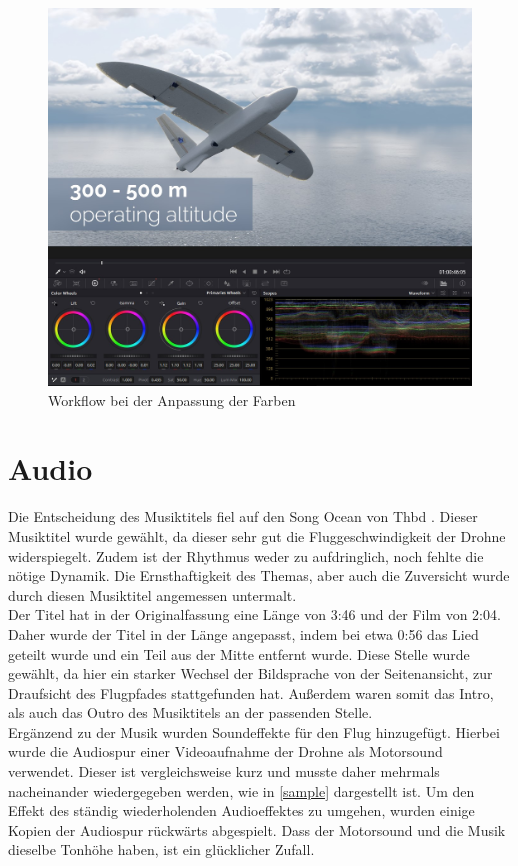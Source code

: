 \begin{figure}[H]
\begin{center}
\includegraphics[width=\textwidth]{gfx/post/resolve7.jpg}
\caption{Workflow bei der Anpassung der Farben}
\label{resolve7}
\end{center}
\end{figure}

\section{Audio}

Die Entscheidung des Musiktitels fiel auf den Song Ocean von Thbd . Dieser Musiktitel wurde gewählt, da dieser sehr gut die Fluggeschwindigkeit der Drohne widerspiegelt. Zudem ist der Rhythmus weder zu aufdringlich, noch fehlte die nötige Dynamik. Die Ernsthaftigkeit des Themas, aber auch die Zuversicht wurde durch diesen Musiktitel angemessen untermalt.\\
Der Titel hat in der Originalfassung eine Länge von 3:46 und der Film von 2:04. Daher wurde der Titel in der Länge angepasst, indem bei etwa 0:56 das Lied geteilt wurde und ein Teil aus der Mitte entfernt wurde. Diese Stelle wurde gewählt, da hier ein starker Wechsel der Bildsprache von der Seitenansicht, zur Draufsicht des Flugpfades stattgefunden hat. Außerdem waren somit das Intro, als auch das Outro des Musiktitels an der passenden Stelle.\\
Ergänzend zu der Musik wurden Soundeffekte für den Flug hinzugefügt. Hierbei wurde die Audiospur einer Videoaufnahme der Drohne als Motorsound verwendet. Dieser ist vergleichsweise kurz und musste daher mehrmals nacheinander wiedergegeben werden, wie in \autoref{sample} dargestellt ist. Um den Effekt des ständig wiederholenden Audioeffektes zu umgehen, wurden einige Kopien der Audiospur rückwärts abgespielt. Dass der Motorsound und die Musik dieselbe Tonhöhe haben, ist ein glücklicher Zufall.\\

